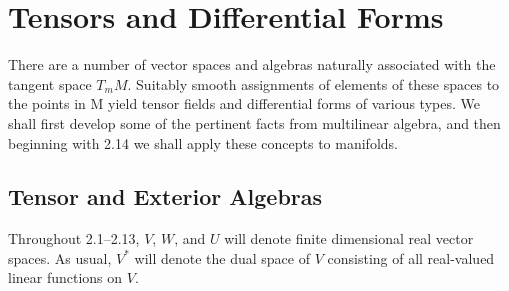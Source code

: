 \chapter{Tensors and Differential Forms}

There are a number of vector spaces and algebras naturally associated with the tangent space  $ T_{m} M $. Suitably smooth assignments of elements of these spaces to the points in M yield tensor fields and differential forms of various types. We shall first develop some of the pertinent facts from multilinear algebra, and then beginning with 2.14 we shall apply these concepts to manifolds.

\section{Tensor and Exterior Algebras}


Throughout 2.1–2.13, $V$, $W$, and $U$ will denote finite dimensional real vector spaces. As usual, $V^{*}$ will denote the dual space of $V$ consisting of all real-valued linear functions on $V$.


